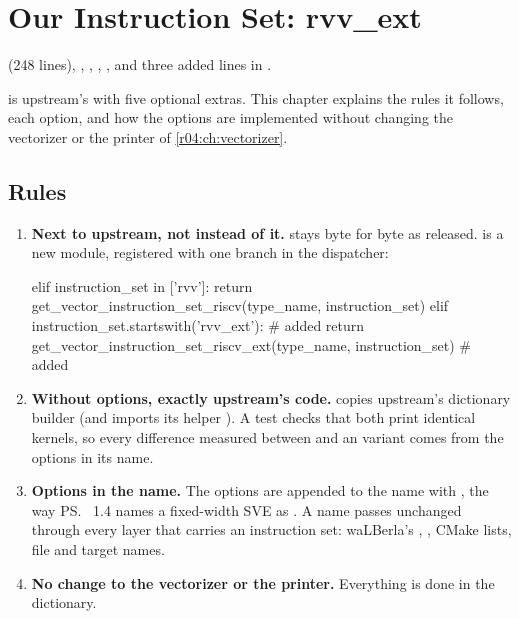\chapter{Our Instruction Set: rvv\_ext}\label{r04:ch:rvv-ext}

\begin{r04fork}
   (248 lines),
  ,
  , ,
  , and three added lines in
  .
\end{r04fork}

 is upstream's  with five optional extras. This chapter explains
the rules it follows, each option, and how the options are implemented without changing
the vectorizer or the printer of \cref{r04:ch:vectorizer}.

\section{Rules}\label{r04:sec:ext-rules}

\begin{enumerate}
  \item \textbf{Next to upstream, not instead of it.}  stays byte for byte as
    released.  is a new module, registered with one branch in the
    dispatcher:
\begin{pycode}
    elif instruction_set in ['rvv']:
        return get_vector_instruction_set_riscv(type_name, instruction_set)
    elif instruction_set.startswith('rvv_ext'):                              # added
        return get_vector_instruction_set_riscv_ext(type_name, instruction_set)  # added
\end{pycode}
  \item \textbf{Without options, exactly upstream's code.}  copies
    upstream's dictionary builder (and imports its helper ).
    A test checks that both print identical kernels, so every difference measured
    between  and an  variant comes from the options in its name.
  \item \textbf{Options in the name.} The options are appended to the name with
    \code{-}, the way \ps{}~1.4 names a fixed-width SVE as . A name passes
    unchanged through every layer that carries an instruction set: waLBerla's
    , , CMake lists, file and target names.
  \item \textbf{No change to the vectorizer or the printer.} Everything is done in the
    dictionary.
\end{enumerate}

